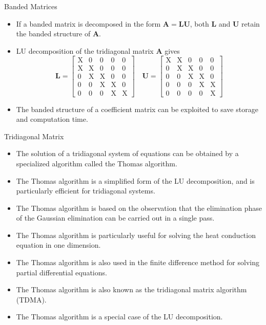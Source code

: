 \documentclass{beamer}
\begin{document}
\begin{frame}{Banded Matrices}
    \begin{itemize}
    \item If a banded matrix is decomposed in the form
    $\mathbf{A} = \mathbf{L}\mathbf{U}$, both $\mathbf{L}$ and $\mathbf{U}$ retain the banded structure of $\mathbf{A}$. 
   \item LU decomposition of the tridiagonal matrix $\mathbf{A}$ gives
   \[
    \mathbf{L}=\left[\begin{array}{lllll}
        \mathrm{X} & 0 & 0 & 0 & 0 \\
        \mathrm{X} & \mathrm{X} & 0 & 0 & 0 \\
        0 & \mathrm{X} & \mathrm{X} & 0 & 0 \\
        0 & 0 & \mathrm{X} & \mathrm{X} & 0 \\
        0 & 0 & 0 & \mathrm{X} & \mathrm{X}
        \end{array}\right] \quad \mathbf{U}=\left[\begin{array}{ccccc}
        \mathrm{X} & \mathrm{X} & 0 & 0 & 0 \\
        0 & \mathrm{X} & \mathrm{X} & 0 & 0 \\
        0 & 0 & \mathrm{X} & \mathrm{X} & 0 \\
        0 & 0 & 0 & \mathrm{X} & \mathrm{X} \\
        0 & 0 & 0 & 0 & \mathrm{X}
        \end{array}\right]
   \]
   \item The banded structure of a coefficient matrix can be exploited to save storage and computation time.
    \end{itemize}
\end{frame}
\begin{frame}{Tridiagonal  Matrix}
\begin{itemize}
\item The solution of a tridiagonal system of equations can be obtained by a specialized algorithm called the \alert{Thomas algorithm}.
\item The Thomas algorithm is a simplified form of the LU decomposition, and is particularly efficient for tridiagonal systems.
\item The Thomas algorithm is based on the observation that the elimination phase of the Gaussian elimination can be carried out in a \alert{single pass}.
\item The Thomas algorithm is particularly useful for solving the \alert{heat conduction equation} in one dimension.
\item The Thomas algorithm is also used in the \alert{finite difference method} for solving partial differential equations.
\item The Thomas algorithm is also known as the \alert{tridiagonal matrix algorithm} (TDMA).
\item The Thomas algorithm is a \alert{special case} of the LU decomposition.

\end{itemize} 
\end{frame}
\end{document}
